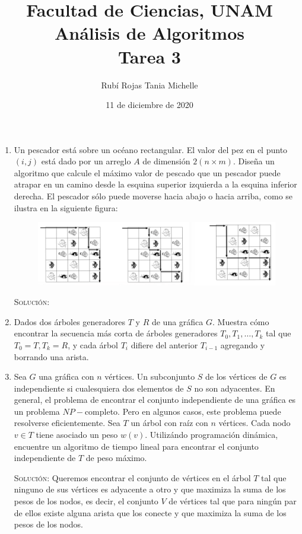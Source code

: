 \documentclass[letterpaper,11pt]{article}
\title{Facultad de Ciencias, UNAM \\ 
       Análisis de Algoritmos \\ 
       Tarea 3}
\author{Rubí Rojas Tania Michelle}
\date{11 de diciembre de 2020}
\begin{document}
\maketitle

\begin{enumerate}
    \item Un pescador está sobre un océano rectangular. El valor del pez en el 
    punto $(i, j)$ está dado por un arreglo $A$ de dimensión $2 (n \times m)$.
    Diseña un algoritmo que calcule el máximo valor de pescado que un pescador
    puede atrapar en un camino desde la esquina superior izquierda a la esquina 
    inferior derecha. El pescador sólo puede moverse hacia abajo o hacia arriba,
    como se ilustra en la siguiente figura: 
    \begin{figure}[h]
        \centering
        \includegraphics[width=0.5\linewidth]{imagenes/ejercicio1.png}
    \end{figure}

    \textsc{Solución:}

    \item Dados dos árboles generadores $T$ y $R$ de una gráfica $G$. Muestra 
    cómo encontrar la secuencia más corta de árboles generadores $T_0, T_1, 
    \ldots, T_k$ tal que $T_0 = T, T_k = R$, y cada árbol $T_i$ difiere del 
    anterior $T_{i-1}$ agregando y borrando una arista.

    \item Sea $G$ una gráfica con $n$ vértices. Un subconjunto $S$ de los 
    vértices de $G$ es independiente si cualesquiera dos elementos de $S$ no 
    son adyacentes. En general, el problema de encontrar el conjunto 
    independiente de una gráfica es un problema $NP-$completo. Pero en 
    algunos casos, este problema puede resolverse eficientemente. Sea $T$ un
    árbol con raíz con $n$ vértices. Cada nodo $v \in T$ tiene asociado un peso 
    $w(v)$. Utilizándo programación dinámica, encuentre un algoritmo de tiempo 
    lineal para encontrar el conjunto independiente de $T$ de peso máximo.

    \textsc{Solución:} Queremos encontrar el conjunto de vértices en el árbol 
    $T$ tal que ninguno de sus vértices es adyacente a otro y que maximiza la 
    suma de los pesos de los nodos, es decir, el conjunto $V$ de vértices tal 
    que para ningún par de ellos existe alguna arista que los conecte y que 
    maximiza la suma de los pesos de los nodos. 


\end{enumerate}
\end{document}
